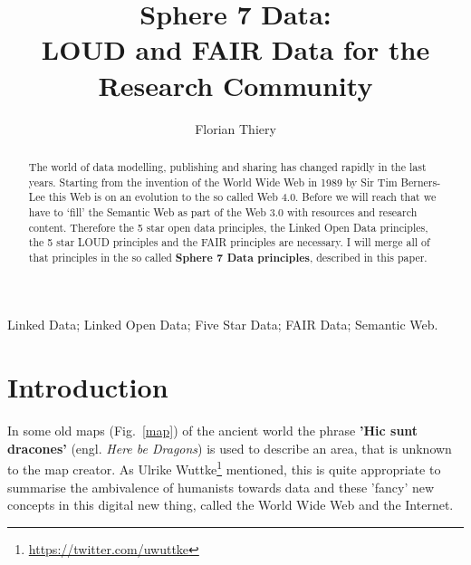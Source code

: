 \documentclass[twocolumn]{autart}
\begin{document}

\begin{frontmatter}

\title{Sphere 7 Data: \protect\\ LOUD and FAIR Data for the Research Community}
                                               

\author[FT]{Florian Thiery}

\address[FT]{rse@fthiery.de - ORCID: 0000-0002-3246-3531 \protect\\ Research Software Engineer, R\"omisch-Germanisches Zentralmuseum, Mainz, Germany}                                         

          
\begin{keyword}                             
Linked Data; Linked Open Data; Five Star Data; FAIR Data; Semantic Web. 
\end{keyword}

\begin{abstract}                         

The world of data modelling, publishing and sharing has changed rapidly in the last years. Starting from the invention of the World Wide Web in 1989 by Sir Tim Berners-Lee this Web is on an evolution to the so called Web 4.0. Before we will reach that we have to ‘fill’ the Semantic Web as part of the Web 3.0 with resources and research content. Therefore the 5 star open data principles, the Linked Open Data principles, the 5 star LOUD principles and the FAIR principles are necessary. I will merge all of that principles in the so called \textbf{Sphere 7 Data principles}, described in this paper.

\end{abstract}

\end{frontmatter}

\section{Introduction}

In some old maps (Fig.~\ref{map}) of the ancient world the phrase \textbf{'Hic sunt dracones'} (engl. \textit{Here be Dragons})\cite{wuttke_here_2019-1} is used to describe an area, that is unknown to the map creator. As Ulrike Wuttke\footnote{\url{https://twitter.com/uwuttke}} mentioned, this is quite appropriate to summarise the ambivalence of humanists towards data and these 'fancy' new concepts\cite{wuttke_here_2019} in this digital new thing, called the World Wide Web and the Internet.
\end{document}
